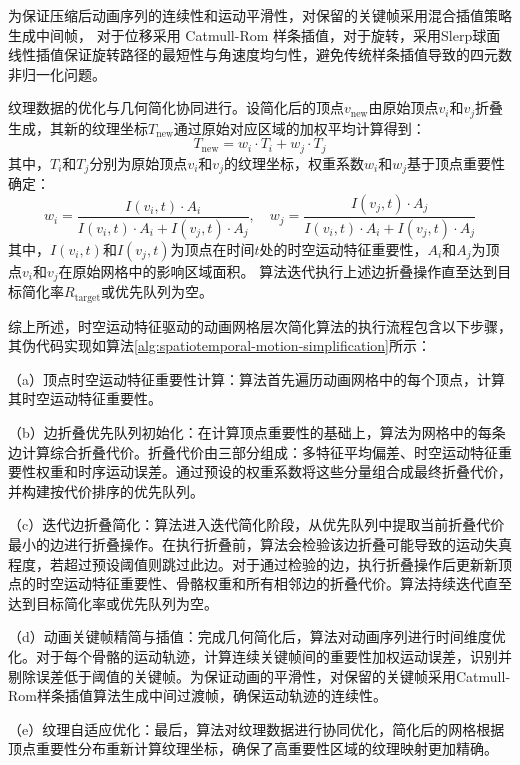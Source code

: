 为保证压缩后动画序列的连续性和运动平滑性，对保留的关键帧采用混合插值策略生成中间帧，
对于位移采用 Catmull-Rom 样条插值，对于旋转，采用Slerp球面线性插值保证旋转路径的最短性与角速度均匀性，避免传统样条插值导致的四元数非归一化问题。

纹理数据的优化与几何简化协同进行。设简化后的顶点$v_{\text{new}}$由原始顶点$v_i$和$v_j$折叠生成，其新的纹理坐标$T_{\text{new}}$通过原始对应区域的加权平均计算得到：
\begin{equation}
T_{\text{new}} = w_i \cdot T_i + w_j \cdot T_j
\end{equation}
其中，$T_i$和$T_j$分别为原始顶点$v_i$和$v_j$的纹理坐标，权重系数$w_i$和$w_j$基于顶点重要性确定：
\begin{equation}
w_i = \frac{I(v_i, t) \cdot A_i}{I(v_i, t) \cdot A_i + I(v_j, t) \cdot A_j}, \quad
w_j = \frac{I(v_j, t) \cdot A_j}{I(v_i, t) \cdot A_i + I(v_j, t) \cdot A_j}
\end{equation}
其中，$I(v_i, t)$和$I(v_j, t)$为顶点在时间$t$处的时空运动特征重要性，$A_i$和$A_j$为顶点$v_i$和$v_j$在原始网格中的影响区域面积。
算法迭代执行上述边折叠操作直至达到目标简化率$R_{\text{target}}$或优先队列为空。

综上所述，时空运动特征驱动的动画网格层次简化算法的执行流程包含以下步骤，其伪代码实现如算法\ref{alg:spatiotemporal-motion-simplification}所示：

（a）顶点时空运动特征重要性计算：算法首先遍历动画网格中的每个顶点，计算其时空运动特征重要性。


（b）边折叠优先队列初始化：在计算顶点重要性的基础上，算法为网格中的每条边计算综合折叠代价。折叠代价由三部分组成：多特征平均偏差、时空运动特征重要性权重和时序运动误差。通过预设的权重系数将这些分量组合成最终折叠代价，并构建按代价排序的优先队列。

（c）迭代边折叠简化：算法进入迭代简化阶段，从优先队列中提取当前折叠代价最小的边进行折叠操作。在执行折叠前，算法会检验该边折叠可能导致的运动失真程度，若超过预设阈值则跳过此边。对于通过检验的边，执行折叠操作后更新新顶点的时空运动特征重要性、骨骼权重和所有相邻边的折叠代价。算法持续迭代直至达到目标简化率或优先队列为空。

（d）动画关键帧精简与插值：完成几何简化后，算法对动画序列进行时间维度优化。对于每个骨骼的运动轨迹，计算连续关键帧间的重要性加权运动误差，识别并剔除误差低于阈值的关键帧。为保证动画的平滑性，对保留的关键帧采用Catmull-Rom样条插值算法生成中间过渡帧，确保运动轨迹的连续性。

（e）纹理自适应优化：最后，算法对纹理数据进行协同优化，简化后的网格根据顶点重要性分布重新计算纹理坐标，确保了高重要性区域的纹理映射更加精确。

